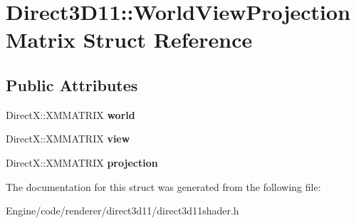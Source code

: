 \hypertarget{struct_direct3_d11_1_1_world_view_projection_matrix}{}\section{Direct3\+D11\+:\+:World\+View\+Projection\+Matrix Struct Reference}
\label{struct_direct3_d11_1_1_world_view_projection_matrix}
\subsection*{Public Attributes}
\begin{DoxyCompactItemize}
\item 
\mbox{\label{struct_direct3_d11_1_1_world_view_projection_matrix_af3693370309b66bfc8c1959e105f1e38}} 
Direct\+X\+::\+X\+M\+M\+A\+T\+R\+IX {\bfseries world}
\item 
\mbox{\label{struct_direct3_d11_1_1_world_view_projection_matrix_a033b50d4e09e34415400dd94464da604}} 
Direct\+X\+::\+X\+M\+M\+A\+T\+R\+IX {\bfseries view}
\item 
\mbox{\label{struct_direct3_d11_1_1_world_view_projection_matrix_adf20b91702289873e46591b97729e555}} 
Direct\+X\+::\+X\+M\+M\+A\+T\+R\+IX {\bfseries projection}
\end{DoxyCompactItemize}


The documentation for this struct was generated from the following file\+:\begin{DoxyCompactItemize}
\item 
Engine/code/renderer/direct3d11/direct3d11shader.\+h\end{DoxyCompactItemize}
